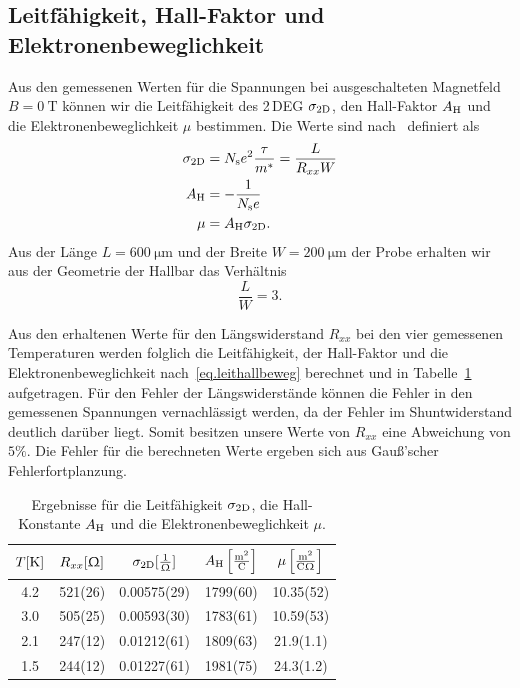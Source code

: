 \documentclass[paper=a4,fontsize=10pt,DIV=18,twocolumn,parskip=half]{scrartcl}
\numberwithin{equation}{section}    %
\begin{document}
\subsection{Leitfähigkeit, Hall-Faktor und Elektronenbeweglichkeit}
\label{a3}

Aus den gemessenen Werten für die Spannungen bei ausgeschalteten Magnetfeld $B=\SI{0}{\tesla}$ können wir die Leitfähigkeit des 2\,DEG $\sigma_{\rm 2D}$, den Hall-Faktor $A_{\rm H}$ und die Elektronenbeweglichkeit $\mu$ bestimmen. Die Werte sind nach~\citet{anleitung} definiert als
\begin{align}
	\sigma_{\rm 2D} &= N_{\rm s} e^2 \frac{\tau}{m^*} = \frac{L}{R_{xx} W}\\
	A_{\rm H} 		&= -\frac{1}{N_{\rm s}e}\\
	\mu 			&= A_{\rm H} \sigma_{\rm 2D}.
	\label{eq.leithallbeweg}
\end{align}
Aus der Länge $L=\SI{600}{\micro\meter}$ und der Breite $W=\SI{200}{\micro\meter}$ der Probe erhalten wir aus der Geometrie der Hallbar das Verhältnis
\begin{equation}
	\frac{L}{W} = 3.
\end{equation}

Aus den erhaltenen Werte für den Längswiderstand $R_{xx}$ bei den vier gemessenen Temperaturen werden folglich die Leitfähigkeit, der Hall-Faktor und die Elektronenbeweglichkeit nach~\eqref{eq.leithallbeweg} berechnet und in Tabelle~\ref{tab.leithallbeweg} aufgetragen. Für den Fehler der Längswiderstände können die Fehler in den gemessenen Spannungen vernachlässigt werden, da der Fehler im Shuntwiderstand deutlich darüber liegt. Somit besitzen unsere Werte von $R_{xx}$ eine Abweichung von $5\%$. Die Fehler für die berechneten Werte ergeben sich aus Gauß'scher Fehlerfortplanzung.

\begin{table}[htp]
	\begin{center}
		\begin{tabular}{ccccc}
			\hline
			$T[\rm K]$ & $R_{xx}[\Upomega]$ & $\sigma_{\rm 2D}[\frac{1}{\Upomega}]$ & $A_{\rm H}\left[ \frac{\mathrm{m}^2}{\mathrm{C}} \right]$ & $\mu \left[ \frac{\mathrm{m}^2}{\mathrm{C}\Upomega} \right]$\\
			\hline
			4.2 & 521(26) & 0.00575(29) & 1799(60) & 10.35(52)\\
			3.0 & 505(25) & 0.00593(30) & 1783(61) & 10.59(53)\\
			2.1 & 247(12) & 0.01212(61) & 1809(63) & 21.9(1.1)\\
			1.5 & 244(12) & 0.01227(61) & 1981(75) & 24.3(1.2)\\
			\hline
		\end{tabular}
		\caption{Ergebnisse für die Leitfähigkeit $\sigma_{\rm 2D}$, die Hall-Konstante $A_{\rm H}$ und die Elektronenbeweglichkeit $\mu$.}
		\label{tab.leithallbeweg}
	\end{center}
\end{table}
%
~~~~~~~~~~~~~~~~~~~~~~~~~~~~~~~~~~~~~~~~~~~~~~~~~~~~~~~~~~~~~~~~~~~~~~~~~~~~~
\end{document}
